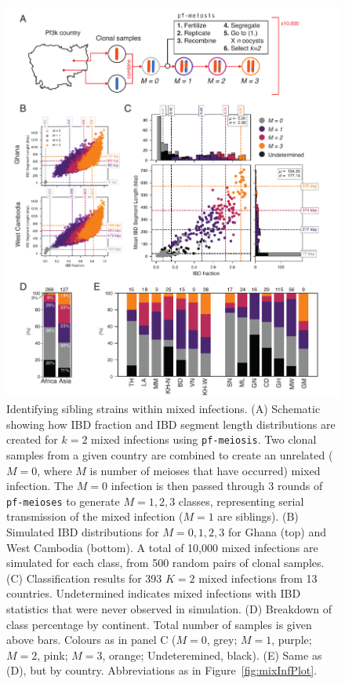 \documentclass[9pt,lineno]{elife}
\begin{document}
\begin{figure}[htp]
  \begin{center}
  \includegraphics[width=\textwidth]{figures/Fig6_corrected.pdf}
   \caption{Identifying sibling strains within mixed infections.  (A) Schematic showing how IBD fraction and IBD segment length distributions are created for $k=2$ mixed infections using \texttt{pf-meiosis}. Two clonal samples from a given country are combined to create an unrelated ($M=0$, where $M$ is number of meioses that have occurred) mixed infection.  The $M=0$ infection is then passed through 3 rounds of \texttt{pf-meioses} to generate $M=1,2,3$ classes, representing serial transmission of the mixed infection ($M=1$ are siblings). (B) Simulated IBD distributions for $M=0,1,2,3$ for Ghana (top) and West Cambodia (bottom). A total of 10,000 mixed infections are simulated for each class, from 500 random pairs of clonal samples. (C) Classification results for 393 $K=2$ mixed infections from 13 countries. Undetermined indicates mixed infections with IBD statistics that were never observed in simulation. (D) Breakdown of class percentage by continent. Total number of samples is given above bars. Colours as in panel C ($M=0$, grey; $M=1$, purple; $M=2$, pink; $M=3$, orange; Undeteremined, black). (E) Same as (D), but by country. Abbreviations as in Figure~\ref{fig:mixInfPlot}.}
   \label{fig:classify}
   \end{center}
\end{figure}
\end{document}
